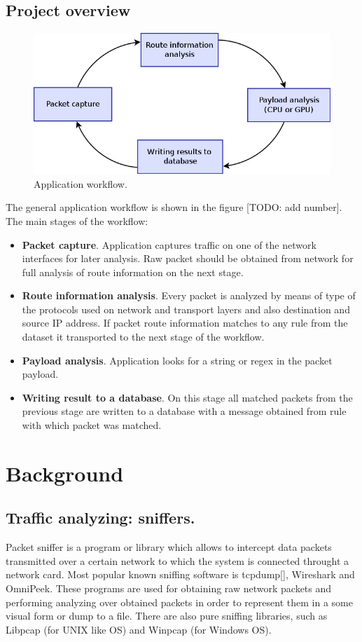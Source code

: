 \documentclass[thesis=M,english]{FITthesis}[2011/07/15]
\begin{document}
\section{Project overview}

\begin{figure}[h]
\centering
\includegraphics[scale=0.4]{images/workflow.png}
\caption{Application workflow.}
\end{figure}

The general application workflow is shown in the figure [TODO: add number].
The main stages of the workflow:
\begin{itemize}
\item \textbf{Packet capture}. Application captures traffic on one of the network interfaces for later analysis. Raw packet should be obtained from network for full analysis of route information on the next stage.
\item \textbf{Route information analysis}. Every packet is analyzed by means of type of the protocols used on network and transport layers and also destination and source IP address. If packet route information matches to any rule from the dataset it transported to the next stage of the workflow.
\item \textbf{Payload analysis}. Application looks for a string or regex in the packet payload.
\item \textbf{Writing result to a database}. On this stage all matched packets from the previous stage are written to a database with a message obtained from rule with which packet was matched.
\end{itemize}

\chapter{Background}
\section{Traffic analyzing: sniffers.}
Packet sniffer is a program or library which allows to intercept data packets transmitted over a certain network to which the system is connected throught a network card. Most popular known sniffing software is tcpdump[], Wireshark and OmniPeek. These programs are used for obtaining raw network packets and performing analyzing over obtained packets in order to represent them in a some visual form or dump to a file. There are also pure sniffing libraries, such as Libpcap (for UNIX like OS) and Winpcap (for Windows OS).
\end{document}
